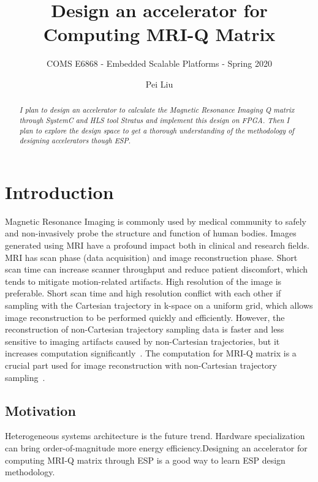 \documentclass{sig-alternate}
\begin{document}
\title{\Large\bf Design an accelerator for Computing MRI-Q Matrix}
\subtitle{\normalsize COMS E6868 - Embedded Scalable Platforms - Spring 2020}

\author{
\alignauthor
Pei Liu\\
\vspace{0.2cm}
}

\vspace{-2cm}

\maketitle

\vspace{-2cm}

\begin{abstract}
{\small\em
  I plan to design an accelerator to calculate the Magnetic Resonance Imaging Q matrix through SystemC and HLS tool Stratus and implement this design on FPGA. Then I plan to explore the design space to get a thorough understanding of the methodology of designing accelerators though ESP. 
}
\end{abstract}

\section{Introduction}
\label{sec:intro}
Magnetic Resonance Imaging is commonly used by medical community to safely and non-invasively probe the structure and function of human bodies. Images generated using MRI have a profound impact both in clinical and research fields. MRI has scan phase (data acquisition) and image reconstruction phase. Short scan time can increase scanner throughput and reduce patient discomfort, which tends to mitigate motion-related artifacts. High resolution of the image is preferable. Short scan time and high resolution conflict with each other if sampling with the Cartesian trajectory in k-space on a uniform grid, which allows image reconstruction to be performed quickly and efficiently. However, the reconstruction of non-Cartesian trajectory sampling data is faster and less sensitive to imaging artifacts caused by non-Cartesian trajectories, but it increases computation significantly~\cite{stone2008accelerating}. The computation for MRI-Q matrix is a crucial part used for image reconstruction with non-Cartesian trajectory sampling~\cite{stratton2012parboil}.

\subsection{Motivation}
Heterogeneous systems architecture is the future trend. Hardware specialization can bring order-of-magnitude more energy efficiency.Designing an accelerator for computing MRI-Q matrix through ESP is a good way to learn ESP design methodology.
\end{document}
